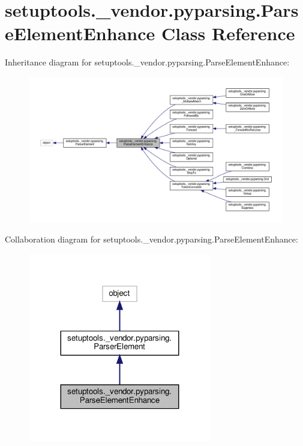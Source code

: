 \hypertarget{classsetuptools_1_1__vendor_1_1pyparsing_1_1ParseElementEnhance}{}\section{setuptools.\+\_\+vendor.\+pyparsing.\+Parse\+Element\+Enhance Class Reference}
\label{classsetuptools_1_1__vendor_1_1pyparsing_1_1ParseElementEnhance}


Inheritance diagram for setuptools.\+\_\+vendor.\+pyparsing.\+Parse\+Element\+Enhance\+:
\nopagebreak
\begin{figure}[H]
\begin{center}
\leavevmode
\includegraphics[width=350pt]{classsetuptools_1_1__vendor_1_1pyparsing_1_1ParseElementEnhance__inherit__graph}
\end{center}
\end{figure}


Collaboration diagram for setuptools.\+\_\+vendor.\+pyparsing.\+Parse\+Element\+Enhance\+:
\nopagebreak
\begin{figure}[H]
\begin{center}
\leavevmode
\includegraphics[width=227pt]{classsetuptools_1_1__vendor_1_1pyparsing_1_1ParseElementEnhance__coll__graph}
\end{center}
\end{figure}
